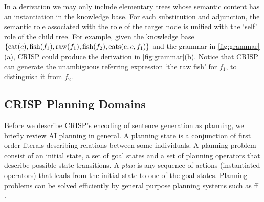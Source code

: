 In a derivation we may only include elementary trees whose semantic content has an instantiation in the knowledge base. For each substitution and adjunction, the semantic role associated with the role of the target node is unified with the `self' role of the child tree. For example, given the knowledge base $\{\mbox{cat}(c), \mbox{fish}(f_1), \mbox{raw}(f_1), \mbox{fish}(f_2), \mbox{eats}(e,c,f_1)\}$ and the grammar in \ref{fig:grammar}(a), CRISP could produce the derivation in \ref{fig:grammar}(b). Notice that CRISP can generate the unambiguous referring expression `the raw fish' for $f_1$, to distinguish it from $f_2$. 


\subsection{CRISP Planning Domains} 
\label{ssec:crispdomain}
Before we describe CRISP's encoding of sentence generation as planning, we briefly review AI planning in general.  A planning state is a conjunction of first order literals describing relations between some individuals. A planning problem consist of an initial state, a set of goal states and a set of planning operators that describe possible state transitions.  A \emph{plan} is any sequence of actions (instantiated operators) that leads from the initial state to one of the goal states. Planning problems can be solved efficiently by general purpose planning systems such as {\sc ff} \cite{hoffmannnebel2001}.
     
